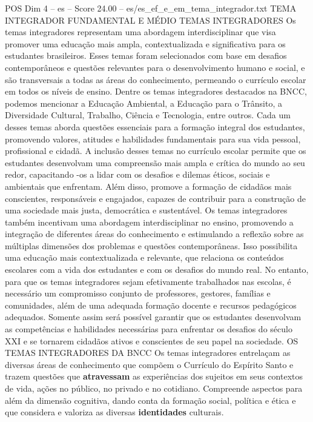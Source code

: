 \begin{textsample}{POS Dim 4 – es – Score 24.00 – es/es\_ef\_e\_em\_tema\_integrador.txt}  \label{ex:f4_pos_071}
TEMA INTEGRADOR FUNDAMENTAL E MÉDIO TEMAS INTEGRADORES Os temas integradores representam uma abordagem interdisciplinar que visa promover uma educação mais ampla, contextualizada e significativa para os estudantes brasileiros.
Esses temas foram selecionados com base em desafios contemporâneos e questões relevantes para o desenvolvimento humano e social, e são transversais a todas as áreas do conhecimento, permeando o currículo escolar em todos os níveis de ensino.
Dentre os temas integradores destacados na BNCC, podemos mencionar a Educação Ambiental, a Educação para o Trânsito, a Diversidade Cultural, Trabalho, Ciência e Tecnologia, entre outros.
Cada um desses temas aborda questões essenciais para a formação integral dos estudantes, promovendo valores, atitudes e habilidades fundamentais para sua vida pessoal, profissional e cidadã.
A inclusão desses temas no currículo escolar permite que os estudantes desenvolvam uma compreensão mais ampla e crítica do mundo ao seu redor, capacitando -os a lidar com os desafios e dilemas éticos, sociais e ambientais que enfrentam.
Além disso, promove a formação de cidadãos mais conscientes, responsáveis e engajados, capazes de contribuir para a construção de uma sociedade mais justa, democrática e sustentável.
Os temas integradores também incentivam uma abordagem interdisciplinar no ensino, promovendo a integração de diferentes áreas do conhecimento e estimulando a reflexão sobre as múltiplas dimensões dos problemas e questões contemporâneas.
Isso possibilita uma educação mais contextualizada e relevante, que relaciona os conteúdos escolares com a vida dos estudantes e com os desafios do mundo real.
No entanto, para que os temas integradores sejam efetivamente trabalhados nas escolas, é necessário um compromisso conjunto de professores, gestores, famílias e comunidades, além de uma adequada formação docente e recursos pedagógicos adequados.
Somente assim será possível garantir que os estudantes desenvolvam as competências e habilidades necessárias para enfrentar os desafios do século XXI e se tornarem cidadãos ativos e conscientes de seu papel na sociedade.
OS TEMAS INTEGRADORES DA BNCC Os temas integradores entrelaçam as diversas áreas de conhecimento que compõem o Currículo do Espírito Santo e trazem questões que \textbf{atravessam} as experiências dos sujeitos em seus contextos de vida, ações no público, no privado e no cotidiano.
Compreende aspectos para além da dimensão cognitiva, dando conta da formação social, política e ética e que considera e valoriza as diversas \textbf{identidades} culturais.

\end{textsample}
